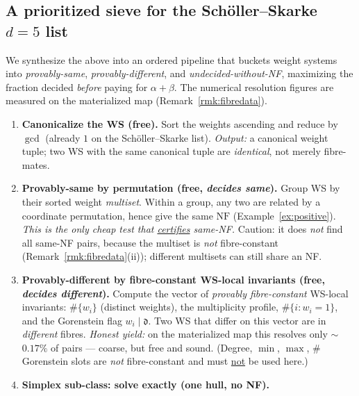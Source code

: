 \documentclass{amsart}
\begin{document}
\subsection{A prioritized sieve for the Sch\"oller--Skarke $d=5$ list}
\label{sec:fibre-sieve}

We synthesize the above into an ordered pipeline that buckets weight systems
into \emph{provably-same}, \emph{provably-different}, and
\emph{undecided-without-NF}, maximizing the fraction decided \emph{before}
paying for $\alpha+\beta$. The numerical resolution figures are measured on the
materialized map (Remark~\ref{rmk:fibredata}).

\begin{enumerate}
  \item[\textbf{S0}] \textbf{Canonicalize the WS (free).} Sort the weights
        ascending and reduce by $\gcd$ (already $1$ on the Sch\"oller--Skarke
        list). \emph{Output:} a canonical weight tuple; two WS with the same
        canonical tuple are \emph{identical}, not merely fibre-mates.
  \item[\textbf{S1}] \textbf{Provably-same by permutation (free, \emph{decides
        same}).} Group WS by their sorted weight \emph{multiset}. Within a
        group, any two are related by a coordinate permutation, hence give the
        same $\mathrm{NF}$ (Example~\ref{ex:positive}). \emph{This is the only
        cheap test that \underline{certifies} same-NF.} Caution: it does
        \emph{not} find all same-NF pairs, because the multiset is \emph{not}
        fibre-constant (Remark~\ref{rmk:fibredata}(ii)); different multisets can
        still share an NF.
  \item[\textbf{S2}] \textbf{Provably-different by fibre-constant WS-local
        invariants (free, \emph{decides different}).} Compute the vector of
        \emph{provably fibre-constant} WS-local invariants:
        $\#\{w_i\}$ (distinct weights), the multiplicity profile, $\#\{i:w_i=1\}$,
        and the Gorenstein flag $w_i\mid\mathfrak d$. Two WS that differ on this
        vector are in \emph{different} fibres. \emph{Honest yield:} on the
        materialized map this resolves only $\sim$$0.17\%$ of pairs --- coarse,
        but free and sound. (Degree, $\min$, $\max$, $\#$Gorenstein slots are
        \emph{not} fibre-constant and must \underline{not} be used here.)
  \item[\textbf{S3}] \textbf{Simplex sub-class: solve exactly (one hull, no NF).}
$$
\end{enumerate}
\end{document}

